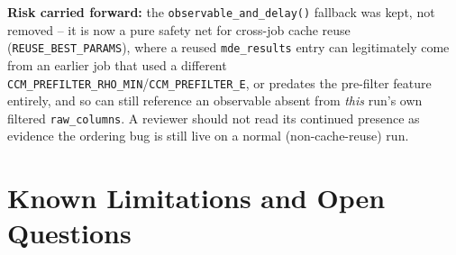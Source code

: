 \documentclass[11pt]{article}
\begin{document}
\textbf{Risk carried forward:} the \texttt{observable\_and\_delay()} fallback was kept, not removed -- it is now a pure safety net for cross-job cache reuse (\texttt{REUSE\_BEST\_PARAMS}), where a reused \texttt{mde\_results} entry can legitimately come from an earlier job that used a different \texttt{CCM\_PREFILTER\_RHO\_MIN}/\texttt{CCM\_PREFILTER\_E}, or predates the pre-filter feature entirely, and so can still reference an observable absent from \emph{this} run's own filtered \texttt{raw\_columns}. A reviewer should not read its continued presence as evidence the ordering bug is still live on a normal (non-cache-reuse) run.

\newpage
\section{Known Limitations and Open Questions}
\label{sec:limitations}
\end{document}
